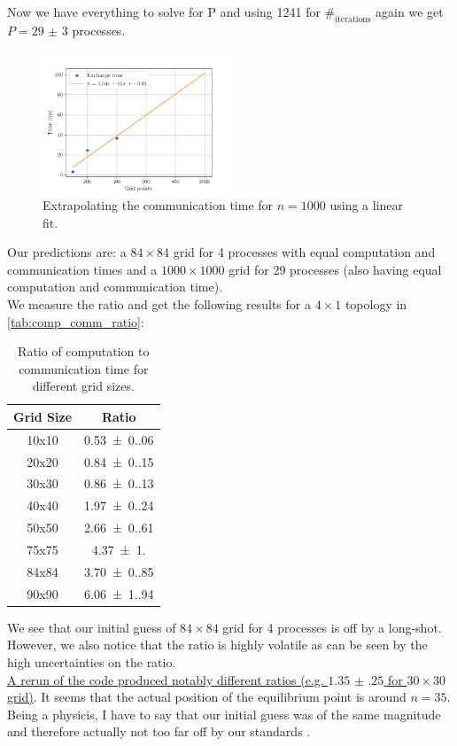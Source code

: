 Now we have everything to solve for P and using 1241 for $\#_\text{{iterations}}$ again we get $P = \num{29(3)}$ processes. 
\begin{figure}[H]
    \centering
    \includegraphics[width=0.5\textwidth]{../fig/lab2/estimate25_stencil.png}
    \caption{Extrapolating the communication time for $n=1000$ using a linear fit.}
    \label{fig:comp_sencil_extra}
\end{figure}

Our predictions are: a $84\times84$ grid for 4 processes with equal computation and communication times and a $1000\times1000$ grid for 29 processes (also having equal computation and communication time).\\
We measure the ratio  and get the following results for a $4\times1$ topology in \autoref{tab:comp_comm_ratio}:

\begin{table}[H]
    \centering
    \caption{Ratio of computation to communication time for different grid sizes.}
    \label{tab:comp_comm_ratio}
    \begin{tabular}{|c|S[table-format=1.2(1.2)]|}
        \hline
        {{{Grid Size}}} & {Ratio} \\\hline
        10x10 & \num{0.53(0.06)} \\\hline
        20x20 & \num{0.84(0.15)} \\\hline
        30x30 & \num{0.86(0.13)} \\\hline
        40x40 & \num{1.97(0.24)} \\\hline
        50x50 & \num{2.66(0.61)} \\\hline
        75x75 & \num{4.37(1.00)} \\\hline
        84x84 & \num{3.70(0.85)} \\\hline
        90x90 & \num{6.06(1.94)} \\\hline
    \end{tabular}
\end{table}
We see that our initial guess of $84\times84$ grid for 4 processes is off by a long-shot. However, we also notice that the ratio is highly volatile as can be seen by the high uncertainties on the ratio.\\\underline{A rerun of the code produced notably different ratios (e.g. $\num{1.35(25)}$ for $30\times30$ grid)}. It seems that the actual position of the equilibrium point is around $n=35$. Being a physicis, I have to say that our initial guess was of the same magnitude and therefore actually not too far off by our standards \smiley.\\


